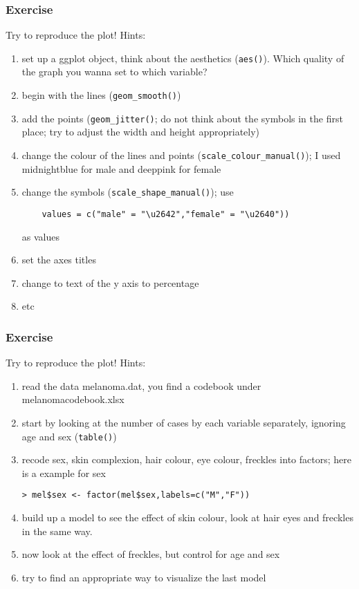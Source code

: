 \begin{frame}[fragile]\frametitle{Exercise}
Try to reproduce the plot! Hints:
  \begin{enumerate}
  \item set up a ggplot object, think about the aesthetics (\texttt{aes()}). Which quality of the graph you wanna set to which variable?
  \item begin with the lines (\texttt{geom\_smooth()})
  \item add the points (\texttt{geom\_jitter()}; do not think about the symbols in the first place; try to adjust the width and height appropriately)
  \item change the colour of the lines and points (\texttt{scale\_colour\_manual()}); I used midnightblue for male and deeppink for female
  \item change the symbols (\texttt{scale\_shape\_manual()}); use
\begin{verbatim}
    values = c("male" = "\u2642","female" = "\u2640"))
\end{verbatim}
     as values
  \item set the axes titles
  \item change to text of the y axis to percentage
  \item etc
  \end{enumerate}
\end{frame}


\begin{frame}[fragile]\frametitle{Exercise}
Try to reproduce the plot! Hints:
  \begin{enumerate}
  \item read the data melanoma.dat, you find a codebook under melanomacodebook.xlsx
  \item start by looking at the number of cases by each variable separately, ignoring age and sex (\texttt{table()})
  \item recode sex, skin complexion, hair colour, eye colour, freckles into factors; here is a example for sex
\begin{verbatim}
> mel$sex <- factor(mel$sex,labels=c("M","F"))
\end{verbatim}
  \item build up a model to see the effect of skin colour, look at hair eyes and freckles in the same way.
  \item now look at the effect of freckles, but control for age and sex
  \item try to find an appropriate way to visualize the last model
  \end{enumerate}
\end{frame}






